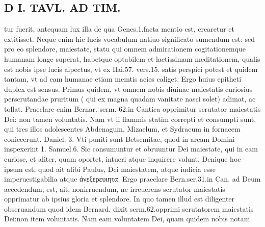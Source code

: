 \documentclass{article}
\begin{document}
\begin{pages}
\section*{D I. TAVL. AD TIM. }
\marginpar{[ p.400 ]}\pstart tur fuerit, antequam lux illa de qua Genes.1.facta mentio est, crearetur et extitisset. Neque enim hic lucis vocabulum natiuo significato sumendum est: sed pro eo splendore, maiestate, statu qui omnem admirationem cogitationemque humanam longe superat, habetque optabilem et laetissimam meditationem, qualis est nobis ipse lucis aipectus, vt ex Ilai.57. vers.15. satis perspici potest et quidem tantam, vt ad eam humanae etiam memtis acies caliget.  \pend\pstart Ergo huius epitheti duplex est sensus. Primus quidem, vt omnem nobis diuinae maiestatis curiosius perscrutandae pruritum ( qui ex magna quadam vanitate nasci solet) adimat, ac tollat. Praeclare enim Bernar. serm. 62.in Cantica opprimitur scrutator maiestatis Dei: non tamen voluntatis. Nam vt ii flammis statim correpti et consumpti sunt, qui tres illos adolescentes Abdenagum, Mizaelum, et Sydracum in fornacem coniecerunt. Daniel. 3. Vti puniti sunt Betsemitae, quod in arcam Domini inspexerint 1. Samuel.6. Sic consumuntur et obruuntur Dei maiestate, qui in eam curiose, et aliter, quam oportet, intueri atque inquirere volunt. Denique  hoc ipsum est, quod ait alibi Paulus, Dei maiestatem, atque iudicia esse imperuestigabilia atque ἀνεξερευιητα. Ergo praeclare Bern.ser.31.in Can. ad Deum accedendum, est, ait, nonirruendum, ne irreuerens scrutator maiestatis opprimatur ab ipsius gloria et splendore. In quo tamen illud est diligenter obseruandum quod idem Bernard. dixit serm.62.opprimi scrutatorem maiestatis Dei:non item voluntatis. Nam eam voluntatem Dei, quam quidem nobis notam  \pend

\end{pages}
\end{document}
